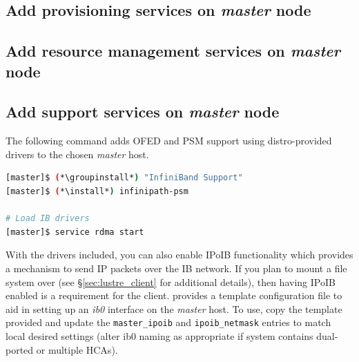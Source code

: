 \documentclass[letterpaper]{article}
\newcommand{\install}{yum -y install}
\newcommand{\groupinstall}{yum -y groupinstall}
\begin{document}



\subsection{Add provisioning services on {\em master} node} \label{sec:add_provisioning}



\subsection{Add resource management services on {\em master} node} \label{sec:add_rm}


\subsection{Add \InfiniBand{} support services on {\em master} node} \label{sec:add_ofed}

The following command adds OFED and PSM support using distro-provided drivers
to the chosen {\em master} host.

\begin{lstlisting}[language=bash,keywords={}]
[master]$ (*\groupinstall*) "InfiniBand Support"
[master]$ (*\install*) infinipath-psm

# Load IB drivers
[master]$ service rdma start
\end{lstlisting}

With the \InfiniBand{} drivers included, you can also enable IPoIB functionality
which provides a mechanism to send IP packets over the IB network. If you plan
to mount a \Lustre{} file system over \InfiniBand{} (see \S\ref{sec:lustre_client}
for additional details), then having IPoIB enabled is a requirement for the
\Lustre{} client. \FSP{} provides a template configuration file to aid in setting up
an {\em ib0} interface on the {\em master} host. To use, copy the template
provided and update the \texttt{master\_ipoib} and
\texttt{ipoib\_netmask} entries to match local desired settings (alter ib0
naming as appropriate if system contains dual-ported or multiple HCAs). 
\end{document}
